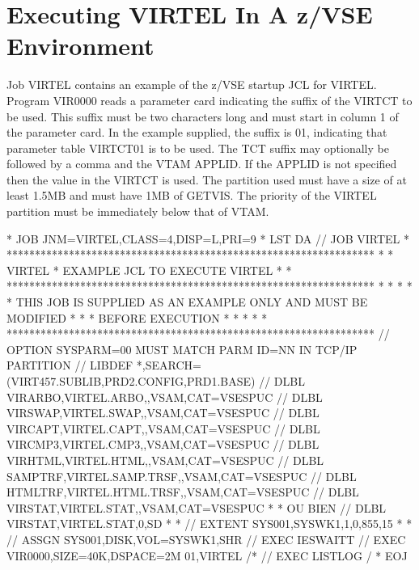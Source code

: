 \documentclass[letterpaper,10pt,english]{sphinxmanual}
\begin{document}
\section{Executing VIRTEL In A z/VSE Environment}
\label{\detokenize{Installation_Guide:executing-virtel-in-a-z-vse-environment}}
Job VIRTEL contains an example of the z/VSE startup JCL for VIRTEL. Program VIR0000 reads a parameter card indicating the suffix of the VIRTCT to be used. This suffix must be two characters long and must start in column 1 of the parameter card. In the example supplied, the suffix is 01, indicating that parameter table VIRTCT01 is to be used. The TCT suffix may optionally be followed by a comma and the VTAM APPLID. If the APPLID is not specified then the value in the VIRTCT is used. The partition used must have a size of at least 1.5MB and must have 1MB of GETVIS. The priority of the VIRTEL partition must be immediately below that of VTAM.

\begin{sphinxVerbatim}[commandchars=\\\{\}]
* \PYGZdl{}\PYGZdl{} JOB JNM=VIRTEL,CLASS=4,DISP=L,PRI=9
* \PYGZdl{}\PYGZdl{} LST DA
// JOB VIRTEL
* *****************************************************************
* * VIRTEL * EXAMPLE JCL TO EXECUTE VIRTEL *
* *****************************************************************
* * *
* * THIS JOB IS SUPPLIED AS AN EXAMPLE ONLY AND MUST BE MODIFIED *
* * BEFORE EXECUTION *
* * *
* *****************************************************************
// OPTION SYSPARM=\PYGZsq{}00\PYGZsq{} MUST MATCH PARM ID=NN IN TCP/IP PARTITION
// LIBDEF *,SEARCH=(VIRT457.SUBLIB,PRD2.CONFIG,PRD1.BASE)
// DLBL VIRARBO,\PYGZsq{}VIRTEL.ARBO\PYGZsq{},,VSAM,CAT=VSESPUC
// DLBL VIRSWAP,\PYGZsq{}VIRTEL.SWAP\PYGZsq{},,VSAM,CAT=VSESPUC
// DLBL VIRCAPT,\PYGZsq{}VIRTEL.CAPT\PYGZsq{},,VSAM,CAT=VSESPUC
// DLBL VIRCMP3,\PYGZsq{}VIRTEL.CMP3\PYGZsq{},,VSAM,CAT=VSESPUC
// DLBL VIRHTML,\PYGZsq{}VIRTEL.HTML\PYGZsq{},,VSAM,CAT=VSESPUC
// DLBL SAMPTRF,\PYGZsq{}VIRTEL.SAMP.TRSF\PYGZsq{},,VSAM,CAT=VSESPUC
// DLBL HTMLTRF,\PYGZsq{}VIRTEL.HTML.TRSF\PYGZsq{},,VSAM,CAT=VSESPUC
// DLBL VIRSTAT,\PYGZsq{}VIRTEL.STAT\PYGZsq{},,VSAM,CAT=VSESPUC
* * OU BIEN // DLBL VIRSTAT,\PYGZsq{}VIRTEL.STAT\PYGZsq{},0,SD
* * // EXTENT SYS001,SYSWK1,1,0,855,15
* * // ASSGN SYS001,DISK,VOL=SYSWK1,SHR
// EXEC IESWAITT
// EXEC VIR0000,SIZE=40K,DSPACE=2M
01,VIRTEL
/*
// EXEC LISTLOG
/\PYGZam{}
* \PYGZdl{}\PYGZdl{} EOJ
\end{sphinxVerbatim}

\end{document}
